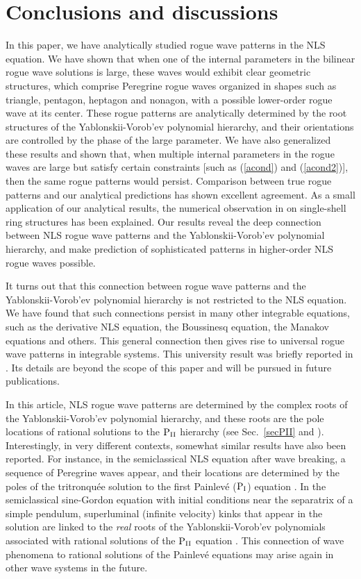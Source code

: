 \documentclass[amsmath,amssymb]{revtex4}
\begin{document}
\section{Conclusions and discussions}
In this paper, we have analytically studied rogue wave patterns in the NLS equation. We have shown that when one of the internal parameters in the bilinear rogue wave solutions is large, these waves would exhibit clear geometric structures, which comprise Peregrine rogue waves organized in shapes such as triangle, pentagon, heptagon and nonagon, with a possible lower-order rogue wave at its center. These rogue patterns are analytically determined by the root structures of the Yablonskii-Vorob'ev polynomial hierarchy, and their orientations are controlled by the phase of the large parameter. We have also generalized these results and shown that, when multiple internal parameters in the rogue waves are large but satisfy certain constraints [such as (\ref{acond}) and (\ref{acond2})], then the same rogue patterns would persist. Comparison between true rogue patterns and our analytical predictions has shown excellent agreement. As a small application of our analytical results, the numerical observation in \cite{KAAN2011} on single-shell ring structures has been explained. Our results reveal the deep connection between NLS rogue wave patterns and the Yablonskii-Vorob'ev polynomial hierarchy, and make prediction of sophisticated patterns in higher-order NLS rogue waves possible.

It turns out that this connection between rogue wave patterns and the Yablonskii-Vorob'ev polynomial hierarchy is not restricted to the NLS equation. We have found that such connections persist in many other integrable equations, such as the derivative NLS equation, the Boussinesq equation, the Manakov equations and others. This general connection then gives rise to universal rogue wave patterns in integrable systems. This university result was briefly reported in \cite{YangYanguniv}. Its details are beyond the scope of this paper and will be pursued in future publications.

In this article, NLS rogue wave patterns are determined by the complex roots of the Yablonskii-Vorob'ev polynomial hierarchy, and these roots are the pole locations of rational solutions to the $\mbox{P}_{\mbox{\scriptsize II}}$ hierarchy (see Sec.~\ref{secPII} and \cite{Clarkson2003-II,Bertola2016}).
Interestingly, in very different contexts, somewhat similar results have also been reported. For instance, in the semiclassical NLS equation after wave breaking, a sequence of Peregrine waves appear, and their locations are determined by the poles of the tritronqu\'ee solution to the first Painlev\'e
($\mbox{P}_{\mbox{\scriptsize I}}$) equation \cite{Tovbis}. In the semiclassical sine-Gordon equation with initial conditions near the separatrix of a simple pendulum, superluminal (infinite velocity) kinks that appear in the solution are linked to the \emph{real} roots of the Yablonskii-Vorob'ev polynomials associated with rational solutions of the $\mbox{P}_{\mbox{\scriptsize II}}$ equation \cite{Miller_sine}. This connection of wave phenomena to rational solutions of the Painlev\'e equations may arise again in other wave systems in the future.
\end{document}
